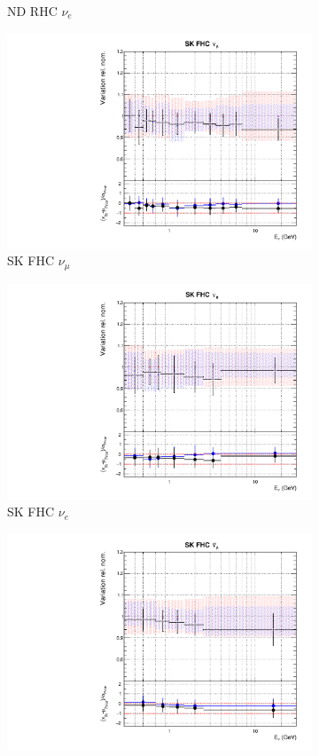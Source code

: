 \begin{figure}[t]
\begin{subfigure}{0.24\textwidth}
  \caption{ND RHC $\nu_e$}
\end{subfigure}
\begin{subfigure}{0.24\textwidth}
  \centering
  \includegraphics[width=0.95\linewidth]{figs/rhcmpasmvflux8}
  \caption{SK FHC $\nu_{\mu}$}
\end{subfigure}
\begin{subfigure}{0.24\textwidth}
  \centering
  \includegraphics[width=0.95\linewidth]{figs/rhcmpasmvflux9}
  \caption{SK FHC $\nu_e$}
\end{subfigure}
\begin{subfigure}{0.24\textwidth}
  \centering
  \includegraphics[width=0.95\linewidth]{figs/rhcmpasmvflux10}

\end{subfigure}
\end{figure}
